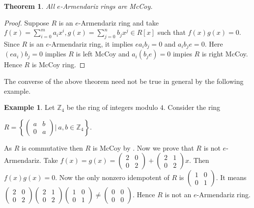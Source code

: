 \documentclass[12pt]{amsart}
\theoremstyle{plain}
\newtheorem{theorem}{Theorem}[section]
\theoremstyle{definition}
\newtheorem{example}{Example}[section]
\theoremstyle{remark}
\numberwithin{equation}{section}
\begin{document}
\begin{theorem}
	All $e$-Armendariz rings are McCoy.
\end{theorem}
\begin{proof}
	Suppose $R$ is an $e$-Armendariz ring and take $f(x)=\sum_{i=0}^{m}a_ix^i, g(x)=\sum_{j=0}^{n}b_jx^j\in R[x]$ such that $f(x)g(x)=0$. Since $R$ is an $e$-Armendariz ring, it implies $ea_ib_j=0$ and $a_ib_je=0$. Here $(ea_i)b_j=0$ implies $R$ is left McCoy and $a_i(b_je)=0$ impies $R$ is right McCoy. Hence $R$ is McCoy ring.
\end{proof}
The converse of the above theorem need not be true in general by the following example.
\begin{example}
	Let $\mathbb{Z}_4$ be the ring of integers modulo $4$. Consider the ring\begin{center}
		
	 $R=\left\{ \begin{pmatrix}
		a&b\\0&a
	\end{pmatrix}\big|~a,b\in \mathbb{Z}_4\right\}.$\end{center}
As $R$ is commutative then $R$ is McCoy by \cite[Theorem 2]{R}. Now we prove that $R$ is not $e$-Armendariz. Take $f(x)=g(x)=\begin{pmatrix}
	2&0\\0&2
\end{pmatrix}+\begin{pmatrix}
2&1\\0&2
\end{pmatrix}x$. Then $f(x)g(x)=0$. Now the only nonzero idempotent of $R$ is $\begin{pmatrix}
1&0\\0&1
\end{pmatrix}$. It means $\begin{pmatrix}
2&0\\0&2
\end{pmatrix}\begin{pmatrix}
2&1\\0&2
\end{pmatrix}\begin{pmatrix}
1&0\\0&1
\end{pmatrix}\ne \begin{pmatrix}
0&0\\0&0
\end{pmatrix}$. Hence $R$ is not an $e$-Armendariz ring.
\end{example}
\end{document}
